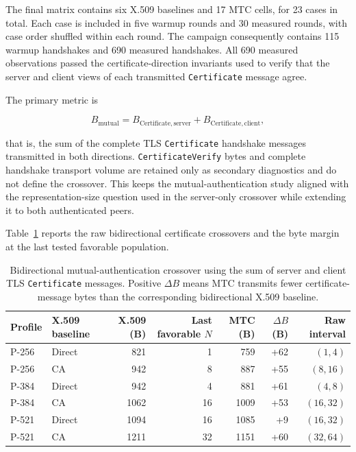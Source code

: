 \documentclass[journal]{IEEEtran}
\begin{document}
The final matrix contains six X.509 baselines and 17 MTC cells, for 23 cases in total. Each case is included in five warmup rounds and 30 measured rounds, with case order shuffled within each round. The campaign consequently contains 115 warmup handshakes and 690 measured handshakes. All 690 measured observations passed the certificate-direction invariants used to verify that the server and client views of each transmitted \texttt{Certificate} message agree.

The primary metric is

\begin{equation}
B_{\mathrm{mutual}} = B_{\mathrm{Certificate,server}} + B_{\mathrm{Certificate,client}},
\end{equation}

that is, the sum of the complete TLS \texttt{Certificate} handshake messages transmitted in both directions. \texttt{CertificateVerify} bytes and complete handshake transport volume are retained only as secondary diagnostics and do not define the crossover. This keeps the mutual-authentication study aligned with the representation-size question used in the server-only crossover while extending it to both authenticated peers.

Table~\ref{tab:mutual-auth-crossover} reports the raw bidirectional certificate crossovers and the byte margin at the last tested favorable population.

\begin{table}[t]
\caption{Bidirectional mutual-authentication crossover using the sum of server and client TLS \texttt{Certificate} messages. Positive $\Delta B$ means MTC transmits fewer certificate-message bytes than the corresponding bidirectional X.509 baseline.}
\label{tab:mutual-auth-crossover}
\centering
\begin{tabular}{llrrrrr}
\toprule
\textbf{Profile} & \textbf{X.509 baseline} & \textbf{X.509 (B)} & \textbf{Last favorable $N$} & \textbf{MTC (B)} & \textbf{$\Delta B$ (B)} & \textbf{Raw interval} \\
\midrule
P-256 & Direct & 821  & 1  & 759  & +62 & $(1,4)$ \\
P-256 & CA     & 942  & 8  & 887  & +55 & $(8,16)$ \\
P-384 & Direct & 942  & 4  & 881  & +61 & $(4,8)$ \\
P-384 & CA     & 1062 & 16 & 1009 & +53 & $(16,32)$ \\
P-521 & Direct & 1094 & 16 & 1085 & +9  & $(16,32)$ \\
P-521 & CA     & 1211 & 32 & 1151 & +60 & $(32,64)$ \\
\bottomrule
\end{tabular}
\end{table}
\end{document}
